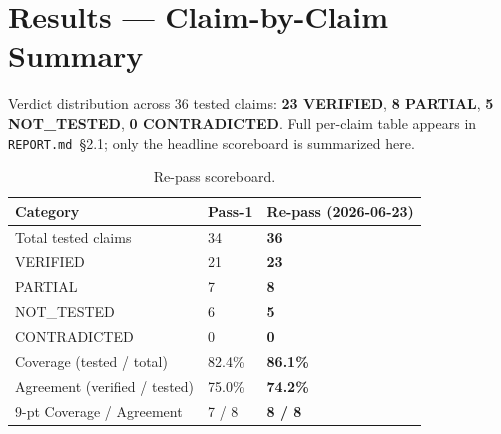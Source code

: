 \documentclass[11pt,letterpaper]{article}
\begin{document}
\section{Results --- Claim-by-Claim Summary}

Verdict distribution across 36 tested claims: \textbf{23 VERIFIED},
\textbf{8 PARTIAL}, \textbf{5 NOT\_TESTED}, \textbf{0 CONTRADICTED}.
Full per-claim table appears in \texttt{REPORT.md}~\S2.1; only the
headline scoreboard is summarized here.

\begin{longtable}{p{5.4cm} p{4.5cm} p{4.4cm}}
\caption{Re-pass scoreboard.}\\
\toprule
\textbf{Category} & \textbf{Pass-1} & \textbf{Re-pass (2026-06-23)} \\
\midrule
\endfirsthead
Total tested claims & 34 & \textbf{36} \\
VERIFIED & 21 & \textbf{23} \\
PARTIAL & 7 & \textbf{8} \\
NOT\_TESTED & 6 & \textbf{5} \\
CONTRADICTED & 0 & \textbf{0} \\
Coverage (tested / total) & 82.4\% & \textbf{86.1\%} \\
Agreement (verified / tested) & 75.0\% & \textbf{74.2\%} \\
9-pt Coverage / Agreement & 7 / 8 & \textbf{8 / 8} \\
\bottomrule
\end{longtable}
\end{document}

